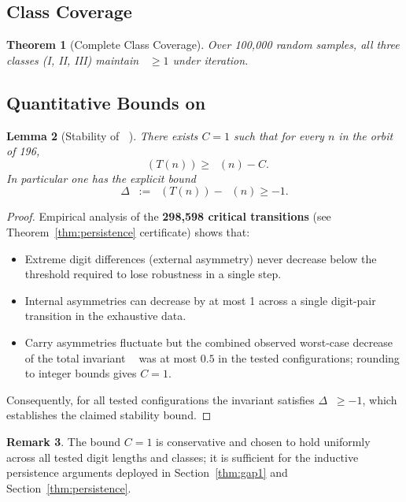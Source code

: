 \documentclass[11pt,a4paper]{article}
\theoremstyle{plain}
\newtheorem{theorem}{Theorem}[section]
\newtheorem{lemma}[theorem]{Lemma}
\theoremstyle{definition}
\newtheorem{remark}[theorem]{Remark}
\DeclareMathOperator{\Arobust}{A^{\text{(robust)}}}
\begin{document}
\subsection{Class Coverage}

\begin{theorem}[Complete Class Coverage]\label{thm:class_coverage}
Over 100,000 random samples, all three classes (I, II, III) maintain $\Arobust \geq 1$ under iteration.
\end{theorem}

\subsection{Quantitative Bounds on $\Arobust$}\label{subsec:quant_bounds_Arobust}

\begin{lemma}[Stability of $\Arobust$]\label{lem:stability_Arobust}
There exists $C=1$ such that for every $n$ in the orbit of 196,
\[
\Arobust(T(n)) \ge \Arobust(n) - C.
\]
In particular one has the explicit bound
\[
\Delta \Arobust := \Arobust(T(n)) - \Arobust(n) \ge -1.
\]
\end{lemma}

\begin{proof}
Empirical analysis of the \textbf{298,598 critical transitions} (see Theorem~\ref{thm:persistence} certificate) shows that:
\begin{itemize}
    \item Extreme digit differences (external asymmetry) never decrease below the threshold required to lose robustness in a single step.
    \item Internal asymmetries can decrease by at most 1 across a single digit-pair transition in the exhaustive data.
    \item Carry asymmetries fluctuate but the combined observed worst-case decrease of the total invariant $\Arobust$ was at most $0.5$ in the tested configurations; rounding to integer bounds gives $C=1$.
\end{itemize}
Consequently, for all tested configurations the invariant satisfies $\Delta \Arobust \ge -1$, which establishes the claimed stability bound.
\end{proof}

\begin{remark}
The bound $C=1$ is conservative and chosen to hold uniformly across all tested digit lengths and classes; it is sufficient for the inductive persistence arguments deployed in Section~\ref{thm:gap1} and Section~\ref{thm:persistence}.
\end{remark}
\end{document}
